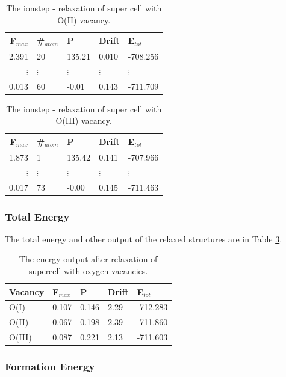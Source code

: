 \begin{table}[H]\caption{The ionstep - relaxation of super cell with O(II) vacancy.}\label{tab:ionstep_O_II}
\begin{tabular}{rllll}
F$_{max}$ &\#$_{atom}$&	P&	Drift&	E$_{tot}$\\ \hline
2.391&	20&	135.21&	0.010&	-708.256	\\
$\vdots$&$\vdots$&$\vdots$&$\vdots$&$\vdots$\\
0.013&	60&	-0.01&	0.143&	-711.709\\
\end{tabular}
\end{table}

\begin{table}[H]\caption{The ionstep - relaxation of super cell with O(III) vacancy.}\label{tab:ionstep_O_III}
\begin{tabular}{rllll}
F$_{max}$ &\#$_{atom}$&	P&	Drift&	E$_{tot}$\\ \hline
1.873&	1&	135.42&	0.141&	-707.966	\\
$\vdots$&$\vdots$&$\vdots$&$\vdots$&$\vdots$\\
0.017&	73&	-0.00&	0.145&	-711.463	\\
\end{tabular}
\end{table}

\subsubsection{Total Energy}

The total energy and other output of the relaxed structures are in Table \ref{tab:energy_supercell_vacancies}.

\begin{table}[H]\caption{The energy output after relaxation of supercell with oxygen vacancies.}\label{tab:energy_supercell_vacancies}
\begin{tabular}{l|llll}
Vacancy& F$_{max}$ &	P&	Drift&	E$_{tot}$ \\ \hline
O(I)&    0.107&	    0.146&	2.29	&    -712.283\\
O(II)&    0.067&	    0.198&	2.39	&    -711.860\\
O(III)&    0.087&    0.221&	2.13	&    -711.603\\
\end{tabular}
\end{table}

\subsubsection{Formation Energy}

